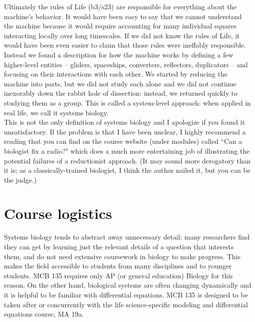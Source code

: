 \documentclass{article}
\begin{document}
Ultimately the rules of Life (b3/s23) are responsible for everything about the machine's behavior. It would have been easy to say that we cannot understand the machine because it would require accounting for many individual squares interacting locally over long timescales. If we did not know the rules of Life, it would have been even easier to claim that those rules were ineffably responsible. Instead we found a description for how the machine works by defining a few higher-level entities -- gliders, spaceships, converters, reflectors, duplicators -- and focusing on their interactions with each other. We started by reducing the machine into parts, but we did not study each alone and we did not continue inexorably down the rabbit hole of dissection: instead, we returned quickly to studying them as a group. This is called a system-level approach: when applied in real life, we call it systems biology.\\

This is not the only definition of systems biology and I apologize if you found it unsatisfactory. If the problem is that I have been unclear, I highly recommend a reading that you can find on the course website (under modules) called ``Can a biologist fix a radio?" which does a much more entertaining job of illustrating the potential failures of a reductionist approach. (It may sound more derogatory than it is; as a classically-trained biologist, I think the author nailed it, but you can be the judge.)

\section*{Course logistics}

Systems biology tends to abstract away unnecessary detail: many researchers find they can get by learning just the relevant details of a question that interests them, and do not need extensive coursework in biology to make progress. This makes the field accessible to students from many disciplines and to younger students. MCB 135 requires only AP (or general education) Biology for this reason. On the other hand, biological systems are often changing dynamically and it is helpful to be familiar with differential equations. MCB 135 is designed to be taken after or concurrently with the life science-specific modeling and differential equations course, MA 19a.\\
\end{document}
